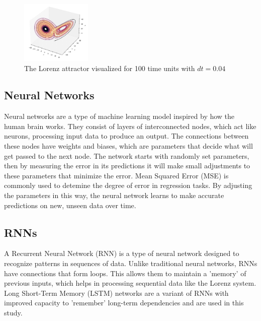 \documentclass[11pt]{article}
\begin{document}
\begin{figure}[h]

\centering
\includegraphics[width=0.3\textwidth]{lorenz_attractor.jpeg}
\caption{The Lorenz attractor visualized for 100 time units with $dt=0.04$}
\label{fig:lorenz_attractor}
\end{figure}

\subsection{Neural Networks}

Neural networks are a type of machine learning model inspired by how the human brain works. They consist of layers of interconnected nodes, which act like neurons, processing input data to produce an output. The connections between these nodes have weights and biases, which are parameters that decide what will get passed to the next node. The network starts with randomly set parameters, then by measuring the error in its predictions it will make small adjustments to these parameters that minimize the error. Mean Squared Error (MSE) is commonly used to detemine the degree of error in regression tasks. By adjusting the parameters in this way, the neural network learns to make accurate predictions on new, unseen data over time.


\subsection{RNNs}

A Recurrent Neural Network (RNN) is a type of neural network designed to recognize patterns in sequences of data. Unlike traditional neural networks, RNNs have connections that form loops. This allows them to maintain a 'memory' of previous inputs, which helps in processing sequential data like the Lorenz system. Long Short-Term Memory (LSTM) networks are a variant of RNNs with improved capacity to 'remember' long-term dependencies and are used in this study.  
\end{document}
